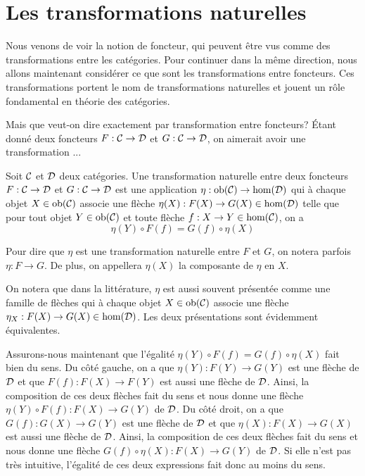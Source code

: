 \section{Les transformations naturelles}
Nous venons de voir la notion de foncteur, qui peuvent être vus comme
des transformations entre les catégories. Pour continuer dans la même
direction, nous allons maintenant considérer ce que sont les transformations
entre foncteurs. Ces transformations portent le nom de transformations
naturelles et jouent un rôle fondamental en théorie des catégories.

Mais que veut-on dire exactement par transformation entre foncteurs?
Étant donné deux foncteurs $F : \mathcal{C} \to \mathcal{D}$ et $G : \mathcal{C} \to \mathcal{D}$, on aimerait
avoir une transformation ...


\begin{définition}
    Soit $\mathcal{C}$ et $\mathcal{D}$ deux catégories. Une transformation naturelle entre
    deux foncteurs $F : \mathcal{C} \to \mathcal{D}$ et $G : \mathcal{C} \to \mathcal{D}$ est une application
    $\eta : \mathrm{ob}(\mathcal{C}) \to \hom(\mathcal{D})$ qui à chaque objet $X \in \mathrm{ob}(\mathcal{C})$ associe
    une flèche $\eta(X) : F(X) \to G(X) \in \hom(\mathcal{D})$ telle que pour tout
    objet $Y \in \mathrm{ob}(\mathcal{C})$ et toute flèche $f : X \to Y \in \hom(\mathcal{C})$, on a
    \[
        \eta(Y) \circ F(f) = G(f) \circ \eta(X)
    \]

    Pour dire que $\eta$ est une transformation naturelle entre $F$ et $G$,
    on notera parfois $\eta : F \to G$. De plus, on appellera $\eta(X)$ la
    composante de $\eta$ en $X$.
\end{définition}

On notera que dans la littérature, $\eta$ est aussi souvent présentée comme
une famille de flèches qui à chaque objet $X \in \mathrm{ob}(\mathcal{C})$ associe une flèche
$\eta_X : F(X) \to G(X) \in \hom(\mathcal{D})$. Les deux présentations sont
évidemment équivalentes.

Assurons-nous maintenant que l'égalité $\eta(Y) \circ F(f) = G(f) \circ \eta(X)$
fait bien du sens. Du côté gauche, on a que $\eta(Y) : F(Y) \to G(Y)$ est une
flèche de $\mathcal{D}$ et que $F(f) : F(X) \to F(Y)$ est aussi une flèche de $\mathcal{D}$.
Ainsi, la composition de ces deux flèches fait du sens et nous donne une flèche
$\eta(Y) \circ F(f) : F(X) \to G(Y)$ de $\mathcal{D}$. Du côté droit, on a que
$G(f) : G(X) \to G(Y)$ est une flèche de $\mathcal{D}$ et que $\eta(X) : F(X) \to G(X)$
est aussi une flèche de $\mathcal{D}$. Ainsi, la composition de ces deux flèches fait
du sens et nous donne une flèche $G(f) \circ \eta(X) : F(X) \to G(Y)$ de $\mathcal{D}$.
Si elle n'est pas très intuitive, l'égalité de ces deux expressions fait donc
au moins du sens.

